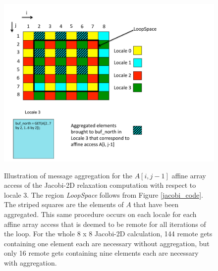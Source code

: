 \begin{figure}
\begin{center}
\includegraphics[width=\linewidth]{./Figures/aggregation}
\renewcommand{\baselinestretch}{1}
\small\normalsize
\begin{quote}
\caption[Message aggregation applied to the Jacobi-2D computation]{Illustration of message aggregation for the $A[i, j-1]$ affine array access of the Jacobi-2D relaxation computation with respect to locale 3. The region \textit{LoopSpace} follows from Figure \ref{jacobi_code}. The striped squares are the elements of $A$ that have been aggregated. This same procedure occurs on each locale for each affine array access that is deemed to be remote for all iterations of the loop. For the whole 8 x 8 Jacobi-2D calculation, 144 remote gets containing one element each are necessary without aggregation, but only 16 remote gets containing nine elements each are necessary with aggregation.\label{aggregation}}
\end{quote}
\end{center}
\end{figure}

